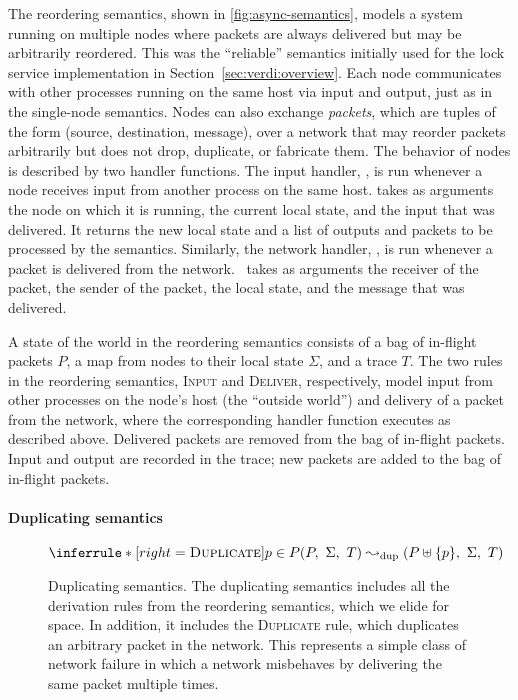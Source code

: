 The reordering semantics, shown in \cref{fig:async-semantics}, models a
system running on multiple nodes where packets are always delivered but
may be arbitrarily reordered.
%
This was the ``reliable'' semantics initially used for the lock
service implementation in Section~\ref{sec:verdi:overview}.
%
Each node communicates with other processes running on the same host via
input and output, just as in the single-node semantics.
%
Nodes can also exchange \textit{packets}, which are tuples of the form
(source, destination, message), over a network that may reorder
packets arbitrarily but does not drop, duplicate, or fabricate
them.
%
The behavior of nodes is described by two handler functions.
%
The input handler, \fHinp, is run whenever a node receives input from
another process on the same host.
%
\fHinp{} takes as arguments the node on which it is running, the current
local state, and the input that was delivered.
%
It returns the new local state and a list of outputs and packets to be
processed by the semantics.
%
Similarly, the network handler, \fHnet, is run whenever a packet
is delivered from the network.
%
\fHnet\ takes as arguments the receiver of the packet, the sender of the
packet, the local state, and the message that was delivered.

A state of the world in the reordering semantics consists of a bag of
in-flight packets $P$, a map from nodes to their local state $\Sigma$, and a
trace $T$.
%
The two rules in the reordering semantics, \textsc{Input} and
\textsc{Deliver}, respectively, model input from other processes on
the node's host (\ie the ``outside world'') and delivery of a packet
from the network, where the corresponding handler function executes
as described above.
%
Delivered packets are removed from the bag of in-flight packets.
%
Input and output are recorded in the trace; new packets are added to the
bag of in-flight packets.

\paragraph{Duplicating semantics}

\begin{figure}[t]

  \begin{footnotesize} \begin{spacing}{1.5} \[
    \inferrule*[right=\textsc{Duplicate}]{
      p \in P
    }{
      (P,\ \Sigma,\ T) \fdupstep (P \uplus \{p\},\ \Sigma,\ T)
    }
  \] \end{spacing} \end{footnotesize}

  \caption{Duplicating semantics.
    The duplicating semantics includes all the derivation rules from
    the reordering semantics, which we elide for space. In addition,
    it includes the \textsc{Duplicate} rule, which duplicates an
    arbitrary packet in the network. This represents a simple class of
    network failure in which a network misbehaves by delivering the
    same packet multiple times.}

\label{fig:dupsem}
\end{figure}

